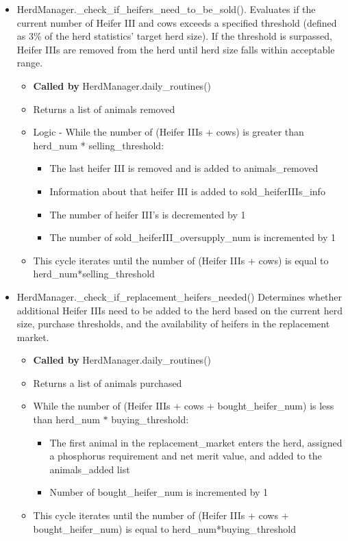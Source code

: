 \documentclass{article}
\begin{document}
\begin{refsection}
         \begin{itemize}
             \item HerdManager.\_check\_if\_heifers\_need\_to\_be\_sold(). Evaluates if the current number of Heifer III and cows exceeds a specified threshold (defined as 3\% of the herd statistics’ target herd size). If the threshold is surpassed, Heifer IIIs are removed from the herd until herd size falls within acceptable range. 
            \begin{itemize}
                \item \textbf{Called by} HerdManager.daily\_routines()
                \item Returns a list of animals removed 
                \item Logic - While the number of (Heifer IIIs + cows) is greater than herd\_num * selling\_threshold: 
                \begin{itemize}
                    \item The last heifer III is removed and is added to animals\_removed 
                    \item Information about that heifer III is added to sold\_heiferIIIs\_info 
                    \item The number of heifer III’s is decremented by 1 
                    \item The number of sold\_heiferIII\_oversupply\_num is incremented by 1 
                \end{itemize}
                \item This cycle iterates until the number of (Heifer IIIs + cows) is equal to herd\_num*selling\_threshold 
            \end{itemize}
            \item HerdManager.\_check\_if\_replacement\_heifers\_needed() Determines whether additional Heifer IIIs need to be added to the herd based on the current herd size, purchase thresholds, and the availability of heifers in the replacement market.
            \begin{itemize}
                \item \textbf{Called by} HerdManager.daily\_routines()
                \item Returns a list of animals purchased 
                \item While the number of (Heifer IIIs + cows + bought\_heifer\_num) is less than herd\_num \( * \) buying\_threshold: 
                \begin{itemize}
                    \item The first animal in the replacement\_market enters the herd, assigned a phosphorus requirement and net merit value, and added to the animals\_added list 
                    \item Number of bought\_heifer\_num is incremented by 1 
                \end{itemize}
                \item This cycle iterates until the number of (Heifer IIIs + cows + bought\_heifer\_num) is equal to herd\_num*buying\_threshold 
            \end{itemize}
         \end{itemize}



\end{refsection}
\end{document}

